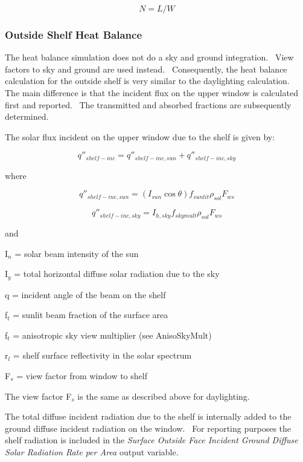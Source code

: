 \begin{equation}
N = L/W
\end{equation}

\subsubsection{Outside Shelf Heat Balance}\label{outside-shelf-heat-balance}

The heat balance simulation does not do a sky and ground integration.~ View factors to sky and ground are used instead.~ Consequently, the heat balance calculation for the outside shelf is very similar to the daylighting calculation.~ The main difference is that the incident flux on the upper window is calculated first and reported.~ The transmitted and absorbed fractions are subsequently determined.

The solar flux incident on the upper window due to the shelf is given by:

\begin{equation}
{q''_{shelf - inc}} = {q''_{shelf - inc,sun}} + {q''_{shelf - inc,sky}}
\end{equation}

where

\begin{equation}
{q''_{shelf - inc,sun}} = \left( {{I_{sun}}\cos \theta } \right){f_{sunlit}}{\rho_{sol}}{F_{ws}}
\end{equation}

\begin{equation}
{q''_{shelf - inc,sky}} = {I_{h,sky}}{f_{skymult}}{\rho_{sol}}{F_{ws}}
\end{equation}

and

I\(_{n}\) = solar beam intensity of the sun

I\(_{y}\) = total horizontal diffuse solar radiation due to the sky

q = incident angle of the beam on the shelf

f\(_{t}\) = sunlit beam fraction of the surface area

f\(_{t}\) = anisotropic sky view multiplier (see AnisoSkyMult)

r\(_{l}\) = shelf surface reflectivity in the solar spectrum

F\(_{s}\) = view factor from window to shelf

The view factor F\(_{s}\) is the same as described above for daylighting.

The total diffuse incident radiation due to the shelf is internally added to the ground diffuse incident radiation on the window.~ For reporting purposes the shelf radiation is included in the \emph{Surface Outside Face Incident Ground Diffuse Solar Radiation Rate per Area} output variable.

